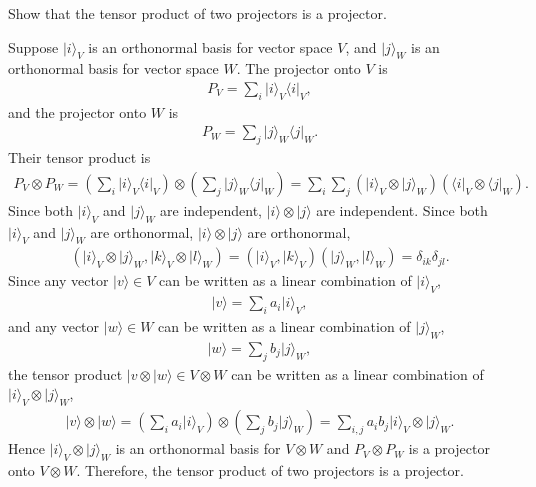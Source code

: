 \documentclass[en]{sol-man}
\begin{document}
\begin{exe}
    Show that the tensor product of two projectors is a projector.
\end{exe}
\begin{pf}
    Suppose $\lvert i\rangle_V$ is an orthonormal basis for vector space $V$, and $\lvert j\rangle_W$ is an orthonormal basis for vector space $W$. The projector onto $V$ is
    \begin{align}
        P_V=\sum_i\lvert i\rangle_V\langle i\lvert_V,
    \end{align}
    and the projector onto $W$ is
    \begin{align}
        P_W=\sum_j\lvert j\rangle_W\langle j\lvert_W.
    \end{align}
    Their tensor product is
    \begin{align}
        P_V\otimes P_W=\left(\sum_i\lvert i\rangle_V\langle i\lvert_V\right)\otimes\left(\sum_j\lvert j\rangle_W\langle j\lvert_W\right)=\sum_i\sum_j(\lvert i\rangle_V\otimes\lvert j\rangle_W)(\langle i\rvert_V\otimes\langle j\rvert_W).
    \end{align}
    Since both $\lvert i\rangle_V$ and $\lvert j\rangle_W$ are independent, $\lvert i\rangle\otimes\lvert j\rangle$ are independent. Since both $\lvert i\rangle_V$ and $\lvert j\rangle_W$ are orthonormal, $\lvert i\rangle\otimes\lvert j\rangle$ are orthonormal,
    \begin{align}
        (\vert i\rangle_V\otimes\lvert j\rangle_W,\lvert k\rangle_V\otimes\lvert l\rangle_W)=(\lvert i\rangle_V,\lvert k\rangle_V)(\lvert j\rangle_W,\lvert l\rangle_W)=\delta_{ik}\delta_{jl}.
    \end{align}
    Since any vector $\lvert v\rangle\in V$ can be written as a linear combination of $\lvert i\rangle_V$,
    \begin{align}
        \lvert v\rangle=\sum_ia_i\lvert i\rangle_V,
    \end{align}
    and any vector $\lvert w\rangle\in W$ can be written as a linear combination of $\lvert j\rangle_W$,
    \begin{align}
        \lvert w\rangle=\sum_jb_j\lvert j\rangle_W,
    \end{align}
    the tensor product $\lvert v\otimes\lvert w\rangle\in V\otimes W$ can be written as a linear combination of $\lvert i\rangle_V\otimes\lvert j\rangle_W$,
    \begin{align}
        \lvert v\rangle\otimes\lvert w\rangle=\left(\sum_ia_i\lvert i\rangle_V\right)\otimes\left(\sum_jb_j\lvert j\rangle_W\right)=\sum_{i,j}a_ib_j\lvert i\rangle_V\otimes\lvert j\rangle_W.
    \end{align}
    Hence $\lvert i\rangle_V\otimes\lvert j\rangle_W$ is an orthonormal basis for $V\otimes W$ and $P_V\otimes P_W$ is a projector onto $V\otimes W$. Therefore, the tensor product of two projectors is a projector.
\end{pf}
\end{document}
